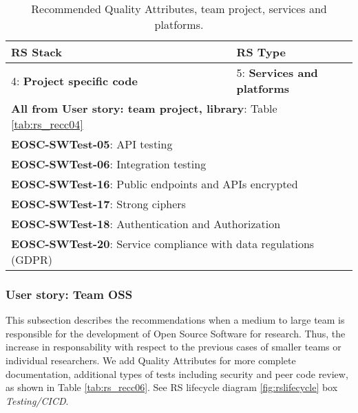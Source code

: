 \begin{center}
\begin{table}[h]

  \small
  \begin{tabular}{|p{0.65\linewidth}|p{0.35\linewidth}|} \hline

    \textbf{RS Stack} & \textbf{RS Type} \\ \hline \hline
    4: \textbf{Project specific code} &
    5: \textbf{Services and platforms} \\ \hline \hline
    \multicolumn{2}{|l|}{\textbf{All from User story: team project, library}: Table \ref{tab:rs_recc04}} \\ \hline
    \multicolumn{2}{|l|}{\textbf{EOSC-SWTest-05}: API testing} \\ \hline
    \multicolumn{2}{|l|}{\textbf{EOSC-SWTest-06}: Integration testing} \\ \hline
    \multicolumn{2}{|l|}{\textbf{EOSC-SWTest-16}: Public endpoints and APIs encrypted} \\ \hline
    \multicolumn{2}{|l|}{\textbf{EOSC-SWTest-17}: Strong ciphers} \\ \hline
    \multicolumn{2}{|l|}{\textbf{EOSC-SWTest-18}: Authentication and Authorization} \\ \hline
    \multicolumn{2}{|l|}{\textbf{EOSC-SWTest-20}: Service compliance with data regulations (GDPR)} \\ \hline

  \end{tabular}
  \caption{Recommended Quality Attributes, team project, services and platforms.}
  \label{tab:rs_recc05}
\end{table}
\end{center}

\subsubsection{User story: Team OSS}

This subsection describes the recommendations when a medium to large team is responsible for the development of Open Source Software for research. Thus, the increase in responsability with respect to the previous cases of smaller teams or individual researchers. We add Quality Attributes for more complete documentation, additional types of tests including security and peer code review, as shown in Table \ref{tab:rs_recc06}. See RS lifecycle diagram \ref{fig:rslifecycle} box \textit{Testing/CICD}.

